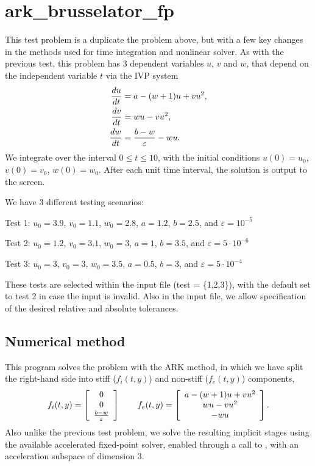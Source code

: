 \documentclass[letterpaper,10pt,english]{sphinxmanual}
\begin{document}
\chapter{ark\_brusselator\_fp}
\label{ark_brusselator_fp:ark-brusselator-fp}\label{ark_brusselator_fp::doc}\label{ark_brusselator_fp:id1}
This test problem is a duplicate the  problem
above, but with a few key changes in the methods used for time
integration and nonlinear solver.  As with the previous test, this
problem has 3 dependent variables $u$, $v$ and $w$,
that depend on the independent variable $t$ via the IVP system
\begin{gather}
\begin{split}\frac{du}{dt} &= a - (w+1)u + v u^2, \\
\frac{dv}{dt} &= w u - v u^2, \\
\frac{dw}{dt} &= \frac{b-w}{\varepsilon} - w u.\end{split}\notag
\end{gather}
We integrate over the interval $0 \le t \le 10$, with the
initial conditions $u(0) = u_0$, $v(0) = v_0$, $w(0) = w_0$.
After each unit time interval, the solution is output to the screen.

We have 3 different testing scenarios:

Test 1:  $u_0=3.9$,  $v_0=1.1$,  $w_0=2.8$,
$a=1.2$, $b=2.5$, and $\varepsilon=10^{-5}$

Test 2:  $u_0=1.2$, $v_0=3.1$, $w_0=3$, $a=1$,
$b=3.5$, and $\varepsilon=5\cdot10^{-6}$

Test 3:  $u_0=3$, $v_0=3$, $w_0=3.5$, $a=0.5$,
$b=3$, and $\varepsilon=5\cdot10^{-4}$

These tests are selected within the input file (test = \{1,2,3\}),
with the default set to test 2 in case the input is invalid.
Also in the input file, we allow specification of the desired
relative and absolute tolerances.


\section{Numerical method}
\label{ark_brusselator_fp:numerical-method}
This program solves the problem with the ARK method, in which we have
split the right-hand side into stiff ($f_i(t,y)$) and non-stiff
($f_e(t,y)$) components,
\begin{gather}
\begin{split}f_i(t,y) = \left[\begin{array}{c}
   0 \\ 0 \\ \frac{b-w}{\varepsilon}
\end{array}\right]
\qquad
f_e(t,y) = \left[\begin{array}{c}
   a - (w+1)u + v u^2 \\ w u - v u^2 \\ - w u
\end{array}\right].\end{split}\notag
\end{gather}
Also unlike the previous test problem, we solve the resulting implicit
stages using the available accelerated fixed-point solver, enabled
through a call to , with an acceleration
subspace of dimension 3.
\end{document}

